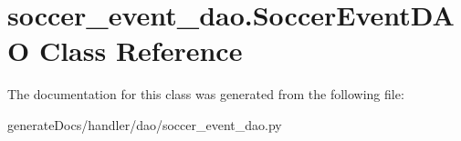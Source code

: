 \hypertarget{classsoccer__event__dao_1_1_soccer_event_d_a_o}{}\section{soccer\+\_\+event\+\_\+dao.\+Soccer\+Event\+D\+AO Class Reference}
\label{classsoccer__event__dao_1_1_soccer_event_d_a_o}


The documentation for this class was generated from the following file\+:\begin{DoxyCompactItemize}
\item 
generate\+Docs/handler/dao/soccer\+\_\+event\+\_\+dao.\+py\end{DoxyCompactItemize}
